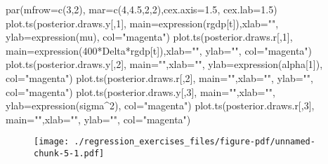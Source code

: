 \documentclass[
  letterpaper,
  DIV=11,
  numbers=noendperiod]{scrreprt}
\newenvironment{Shaded}{\begin{snugshade}}{\end{snugshade}}
\newcommand{\AttributeTok}[1]{\textcolor[rgb]{0.40,0.45,0.13}{#1}}
\newcommand{\DecValTok}[1]{\textcolor[rgb]{0.68,0.00,0.00}{#1}}
\newcommand{\FloatTok}[1]{\textcolor[rgb]{0.68,0.00,0.00}{#1}}
\newcommand{\FunctionTok}[1]{\textcolor[rgb]{0.28,0.35,0.67}{#1}}
\newcommand{\NormalTok}[1]{\textcolor[rgb]{0.00,0.23,0.31}{#1}}
\newcommand{\SpecialCharTok}[1]{\textcolor[rgb]{0.37,0.37,0.37}{#1}}
\newcommand{\StringTok}[1]{\textcolor[rgb]{0.13,0.47,0.30}{#1}}
\begin{document}
\begin{Shaded}
\begin{Highlighting}[]
\FunctionTok{par}\NormalTok{(}\AttributeTok{mfrow=}\FunctionTok{c}\NormalTok{(}\DecValTok{3}\NormalTok{,}\DecValTok{2}\NormalTok{), }\AttributeTok{mar=}\FunctionTok{c}\NormalTok{(}\DecValTok{4}\NormalTok{,}\FloatTok{4.5}\NormalTok{,}\DecValTok{2}\NormalTok{,}\DecValTok{2}\NormalTok{),}\AttributeTok{cex.axis=}\FloatTok{1.5}\NormalTok{, }\AttributeTok{cex.lab=}\FloatTok{1.5}\NormalTok{)}
\FunctionTok{plot.ts}\NormalTok{(posterior.draws.y[,}\DecValTok{1}\NormalTok{], }\AttributeTok{main=}\FunctionTok{expression}\NormalTok{(rgdp[t]),}\AttributeTok{xlab=}\StringTok{""}\NormalTok{, }\AttributeTok{ylab=}\FunctionTok{expression}\NormalTok{(mu), }\AttributeTok{col=}\StringTok{"magenta"}\NormalTok{)}
\FunctionTok{plot.ts}\NormalTok{(posterior.draws.r[,}\DecValTok{1}\NormalTok{], }\AttributeTok{main=}\FunctionTok{expression}\NormalTok{(}\DecValTok{400}\SpecialCharTok{*}\NormalTok{Delta}\SpecialCharTok{*}\NormalTok{rgdp[t]),}\AttributeTok{xlab=}\StringTok{""}\NormalTok{, }\AttributeTok{ylab=}\StringTok{""}\NormalTok{, }\AttributeTok{col=}\StringTok{"magenta"}\NormalTok{)}
\FunctionTok{plot.ts}\NormalTok{(posterior.draws.y[,}\DecValTok{2}\NormalTok{], }\AttributeTok{main=}\StringTok{""}\NormalTok{,}\AttributeTok{xlab=}\StringTok{""}\NormalTok{, }\AttributeTok{ylab=}\FunctionTok{expression}\NormalTok{(alpha[}\DecValTok{1}\NormalTok{]), }\AttributeTok{col=}\StringTok{"magenta"}\NormalTok{)}
\FunctionTok{plot.ts}\NormalTok{(posterior.draws.r[,}\DecValTok{2}\NormalTok{], }\AttributeTok{main=}\StringTok{""}\NormalTok{,}\AttributeTok{xlab=}\StringTok{""}\NormalTok{, }\AttributeTok{ylab=}\StringTok{""}\NormalTok{, }\AttributeTok{col=}\StringTok{"magenta"}\NormalTok{)}
\FunctionTok{plot.ts}\NormalTok{(posterior.draws.y[,}\DecValTok{3}\NormalTok{], }\AttributeTok{main=}\StringTok{""}\NormalTok{,}\AttributeTok{xlab=}\StringTok{""}\NormalTok{, }\AttributeTok{ylab=}\FunctionTok{expression}\NormalTok{(sigma}\SpecialCharTok{\^{}}\DecValTok{2}\NormalTok{), }\AttributeTok{col=}\StringTok{"magenta"}\NormalTok{)}
\FunctionTok{plot.ts}\NormalTok{(posterior.draws.r[,}\DecValTok{3}\NormalTok{], }\AttributeTok{main=}\StringTok{""}\NormalTok{,}\AttributeTok{xlab=}\StringTok{""}\NormalTok{, }\AttributeTok{ylab=}\StringTok{""}\NormalTok{, }\AttributeTok{col=}\StringTok{"magenta"}\NormalTok{)}
\end{Highlighting}
\end{Shaded}

\begin{figure}[H]

{\centering \texttt{[image: ./regression\_exercises\_files/figure-pdf/unnamed-chunk-5-1.pdf]}

}

\end{figure}
\end{document}
